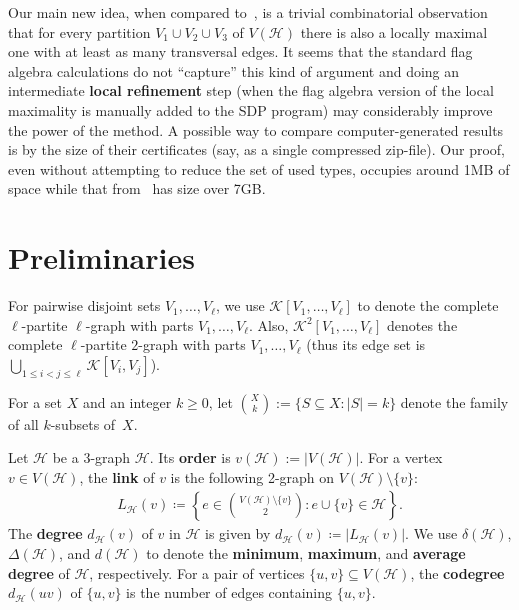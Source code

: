 \documentclass[11pt,a4paper]{article}
\theoremstyle{remark}
\newcommand{\C}[1]{\mathcal{#1}}
\newcommand{\hide}[1]{}
\begin{document}
Our main new idea, when compared  to~\cite{BHLP16C5,LMP24}, is a trivial combinatorial observation that for every partition $V_1\cup V_2\cup V_3$ of $V(\C H)$ there is also a locally maximal one with at least as many transversal edges. It seems that the standard flag algebra calculations do not ``capture'' this kind of argument and doing an intermediate \textbf{local refinement} step (when  the flag algebra version  of the local maximality is manually added to the SDP program) may considerably improve the power of the method. A possible way to compare computer-generated results is by the size of their certificates (say, as a single compressed zip-file). Our proof, even without attempting to reduce the set of used types, occupies around 1MB of space while that from~\cite{LMP24} has size over 7GB. 




\section{Preliminaries}\label{SEC:Prelim}
%
For pairwise disjoint sets $V_1, \ldots, V_{\ell}$, we use $\mathcal{K}[V_1, \ldots, V_{\ell}]$ to denote the complete $\ell$-partite $\ell$-graph with parts $V_1, \ldots, V_{\ell}$. Also, $\mathcal{K}^2[V_1, \ldots, V_{\ell}]$ denotes the complete $\ell$-partite $2$-graph with parts $V_1, \ldots, V_{\ell}$ (thus its edge set is $\bigcup_{1\le i<j\le \ell}\mathcal{K}[V_i,V_j]$).

For a set $X$ and an integer $k\ge 0$, let ${X\choose k}:=\{S \subseteq X \colon |S|=k\}$ denote the family of all $k$-subsets of~$X$.

Let $\C H$ be a $3$-graph $\mathcal{H}$. Its \textbf{order} is $v(\C H):=|V(\C H)|$.
For a vertex $v \in V(\mathcal{H})$, 
the \textbf{link} of $v$ is the following 2-graph on $V(\C H)\setminus\{v\}$:
\begin{align*}
    L_{\mathcal{H}}(v)
    \coloneqq \left\{e\in \binom{V(\mathcal{H})\setminus \{v\}}{2} \colon e \cup \{v\} \in \mathcal{H}\right\}.
\end{align*}
%
The \textbf{degree} $d_{\mathcal{H}}(v)$ of $v$ in $\mathcal{H}$ is given by $d_{\mathcal{H}}(v) \coloneqq |L_{\mathcal{H}}(v)|$.
We use $\delta(\mathcal{H})$, $\Delta(\mathcal{H})$, and $d(\mathcal{H})$ to denote the \textbf{minimum}, \textbf{maximum}, and \textbf{average degree} of $\mathcal{H}$, respectively.
For a pair of vertices $\{u,v\} \subseteq V(\mathcal{H})$, the \textbf{codegree} $d_{\mathcal{H}}(uv)$ of $\{u,v\}$ is the number of edges containing $\{u,v\}$. 
\hide{
Given another $3$-graph $F$, we let $N(F,\mathcal{H})$ denote the number of copies of $F$ in $\mathcal{H}$.
More precisely, 
\begin{align*}
    N(F,\mathcal{H})
    \coloneqq \left|\left\{\{e_1, \ldots, e_{|F|}\} \subseteq \mathcal{H} \colon \{e_1, \ldots, e_{|F|}\} \text{ spans a copy of } F\right\}\right|.
\end{align*}

%
The \textbf{$F$-density} of $\mathcal{H}$ is given by $d(F,\mathcal{H}) \coloneqq \frac{N(F,\mathcal{H})}{\binom{v(\mathcal{H})}{v(F)}}$.}%
\end{document}

